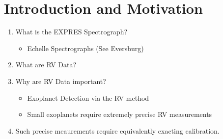 \chapter{Introduction and Motivation} \label{chapter:introduction}
\begin{enumerate}
\item What is the EXPRES Spectrograph?
\begin{itemize}
\item Echelle Spectrographs (See Eversburg)
\end{itemize}
\item What are RV Data?
\item Why are RV Data important?
\begin{itemize}
\item Exoplanet Detection via the RV method
\item Small exoplanets require extremely precise RV measurements
\end{itemize}
\item Such precise meaurements require equivalently exacting calibration.
\end{enumerate}

